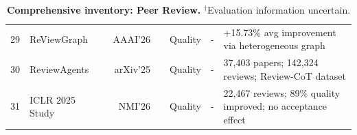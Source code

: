 \documentclass{llmxive}
\providecommand{\levelbadge}[2]{  \tcbox[on line, nobeforeafter, tcbox raise base,
         boxsep=0pt, left=2pt, right=2pt, top=0.5pt, bottom=0.5pt,
         arc=1.5pt, boxrule=0.3pt,
         colback=#1!15, colframe=#1!70]    {\scriptsize\bfseries\sffamily#2}}
\providecommand{\Ssix}{\texorpdfstring{\levelbadge{S6color}{S6}}{S6}\xspace}
\begin{document}
\begin{table}[!ht]
{\begin{tabular}{c| >{\centering\arraybackslash}p{3cm} r r |c| >{\centering\arraybackslash}p{2.1cm} |c| p{7.8cm}}
{29} & ReViewGraph & \cite{reviewgraph2025} & {\small AAAI'26} & \href{https://arxiv.org/abs/2511.08317}{} & Quality          & -                                                                     & +15.73\% avg improvement via heterogeneous graph \\
{30} & ReviewAgents & \cite{reviewagents2025} & {\small arXiv'25} & \href{https://arxiv.org/abs/2503.08506}{} & Quality          & -                                                                     & 37,403 papers; 142,324 reviews; Review-CoT dataset \\
{31} & ICLR 2025 Study & \cite{iclr2025reviewstudy} & {\small NMI'26} & \href{https://www.nature.com/articles/s42256-026-01188-x}{} & Quality       & -                                                                     & 22,467 reviews; 89\% quality improved; no acceptance effect \\
\bottomrule
\end{tabular}}
\caption{\textbf{Comprehensive inventory: \Ssix Peer Review.} $^\dagger$Evaluation information uncertain.}
\end{table}
\endgroup
\end{document}

